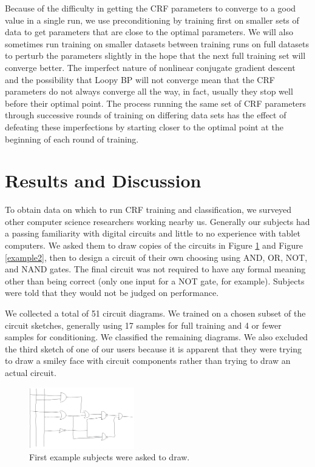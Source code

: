 \documentclass[10pt]{acmsiggraph}               %
\begin{document}
Because of the difficulty in getting the CRF parameters to converge to
a good value in a single run, we use preconditioning by training first
on smaller sets of data to get parameters that are close to the
optimal parameters.  We will also sometimes run training on smaller
datasets between training runs on full datasets to perturb the
parameters slightly in the hope that the next full training set will
converge better.  The imperfect nature of nonlinear conjugate gradient
descent and the possibility that Loopy BP will not converge mean that
the CRF parameters do not always converge all the way, in fact,
usually they stop well before their optimal point. The process running
the same set of CRF parameters through successive rounds of training
on differing data sets has the effect of defeating these imperfections
by starting closer to the optimal point at the beginning of each round
of training.

\section{Results and Discussion}

To obtain data on which to run CRF training and classification, we
surveyed other computer science researchers working nearby us.
Generally our subjects had a passing familiarity with digital circuits
and little to no experience with tablet computers.  We asked them to
draw copies of the circuits in Figure \ref{example1} and Figure
\ref{example2}, then to design a circuit of their own choosing using
AND, OR, NOT, and NAND gates. The final circuit was not required to
have any formal meaning other than being correct (only one input for a
NOT gate, for example).  Subjects were told that they would not be
judged on performance.

We collected a total of 51 circuit diagrams.  We trained on a chosen
subset of the circuit sketches, generally using 17 samples for full
training and 4 or fewer samples for conditioning.  We classified the
remaining diagrams.  We also excluded the third sketch of one of our
users because it is apparent that they were trying to draw a smiley
face with circuit components rather than trying to draw an actual
circuit.

\begin{figure}[h]
\centering
\includegraphics[width=1.8in]{example1.png}
\caption{First example subjects were asked to draw.}
\label{example1}
\end{figure}
\end{document}
